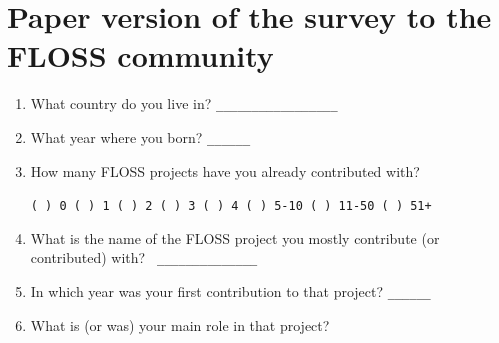 \documentclass[lnbip]{svmultln}
\begin{document}
\appendix
\section{Paper version of the survey to the FLOSS community}
\label{appendix:a}

\begin{enumerate}
\item What country do you live in? \verb=_________________=
  \vspace{10pt}

\item What year where you born? \verb=______= \vspace{10pt}

\item How many FLOSS projects have you already contributed with?

  \verb=( ) 0 ( ) 1 ( ) 2 ( ) 3 ( ) 4 ( ) 5-10 ( ) 11-50 ( ) 51+=
  \vspace{10pt}

\item What is the name of the FLOSS project you mostly contribute (or
  contributed) with? \verb= ______________= \vspace{10pt}

\item In which year was your first contribution to that project?
  \verb=______= \vspace{10pt}

\item What is (or was) your main role in that project?
  \vspace{10pt}


\end{enumerate}
\end{document}
